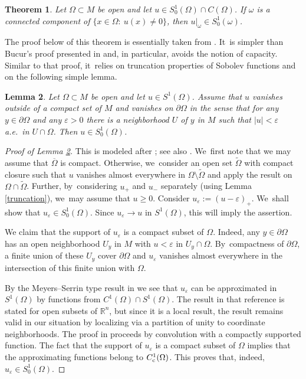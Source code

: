 \documentclass[10pt]{amsart}
\newcommand{\rc}{\textup{c}}
\newtheorem{theorem}{Theorem}[section]
\newtheorem{lemma}[theorem]{Lemma}
\theoremstyle{definition}
\let\epsilon\varepsilon
\newcommand{\1}{\mathbbm{1}}
\newcommand{\R}{\mathbb{R}}
\begin{document}
\begin{theorem}\label{restriction}
Let $\Omega\subset M$ be open and let $u\in S^1_0(\Omega)\cap C(\Omega)$. If $\omega$ is a connected component of $\{ x\in\Omega:\ u(x)\neq 0\}$, then $u|_\omega \in S^1_0(\omega)$.
\end{theorem}

The proof below of this theorem is essentially taken from \cite{MP}. It~is simpler than Bucur's proof presented in \cite{LMP} and, in particular, avoids the notion of capacity. Similar to that proof, it~relies on truncation properties of Sobolev functions and on the following simple lemma.

\begin{lemma}\label{s10easy}
Let $\Omega\subset M$ be open and let $u\in S^1(\Omega)$. Assume that $u$ vanishes outside of a compact set of $M$ and vanishes on $\partial\Omega$ in the sense that for any $y\in\partial\Omega$ and any $\epsilon>0$ there is a neighborhood $U$ of $y$ in $M$ such that $|u|<\epsilon$ a.e.\ in $U\cap\Omega$. Then $u\in S^1_0(\Omega)$.
\end{lemma}

\begin{proof}[Proof of Lemma \ref{s10easy}]
This is modeled after \cite[Lem.\,1.26]{HeKiMa}; see also \cite[Lem.\,1]{HeNoSw}. We~first note that we may assume that $\overline\Omega$ is compact. Otherwise, we~consider an open set $\widetilde \Omega$ with compact closure such that $u$ vanishes almost everywhere in $\Omega\setminus\widetilde \Omega$ and apply the result on $\Omega\cap\widetilde \Omega$. Further, by~considering $u_+$ and $u_-$ separately (using Lemma \ref{truncation}), we~may assume that $u\geq 0$. Consider $u_\epsilon:=(u-\epsilon)_+$. We~shall show that $u_\epsilon\in S^1_0(\Omega)$. Since $u_\epsilon\to u$ in $S^1(\Omega)$, this will imply the assertion.

We claim that the support of $u_\epsilon$ is a compact subset of $\Omega$. Indeed, any $y\in\partial\Omega$ has an open neighborhood $U_y$ in $M$ with $u<\epsilon$ in $U_y\cap\Omega$. By~compactness of $\partial\Omega$, a finite union of these $U_y$ cover $\partial\Omega$ and $u_\epsilon$ vanishes almost everywhere in the intersection of this finite union with $\Omega$.

By the Meyers--Serrin type result in \cite[Th.\,1.13]{GaNh} we see that $u_\epsilon$ can be approximated in $S^1(\Omega)$ by functions from $C^1(\Omega)\cap S^1(\Omega)$. The result in that reference is stated for open subsets of $\R^n$, but since it is a local result, the result remains valid in our situation by localizing via a partition of unity to coordinate neighborhoods. The proof in \cite{GaNh} proceeds by convolution with a compactly supported function. The fact that the support of $u_\epsilon$ is a compact subset of $\Omega$ implies that the approximating functions belong to $C^1_\rc(\Omega)$. This proves that, indeed, $u_\epsilon\in S^1_0(\Omega)$.
\end{proof}
\end{document}
